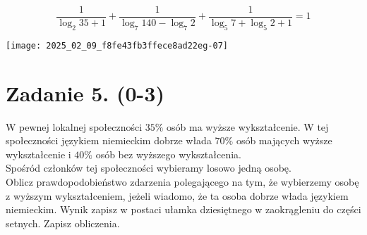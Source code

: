 \documentclass[10pt]{article}
\begin{document}
\[
\frac{1}{\log _{2} 35+1}+\frac{1}{\log _{7} 140-\log _{7} 2}+\frac{1}{\log _{5} 7+\log _{5} 2+1}=1
\]

\begin{center}
\texttt{[image: 2025\_02\_09\_f8fe43fb3ffece8ad22eg-07]}
\end{center}

\section*{Zadanie 5. (0-3)}
W pewnej lokalnej społeczności \(35 \%\) osób ma wyższe wykształcenie. W tej społeczności językiem niemieckim dobrze włada \(70 \%\) osób mających wyższe wykształcenie i \(40 \%\) osób bez wyższego wykształcenia.\\
Spośród członków tej społeczności wybieramy losowo jedną osobę.\\
Oblicz prawdopodobieństwo zdarzenia polegającego na tym, że wybierzemy osobę z wyższym wykształceniem, jeżeli wiadomo, że ta osoba dobrze włada językiem niemieckim. Wynik zapisz w postaci ułamka dziesiętnego w zaokrągleniu do części setnych. Zapisz obliczenia.
\end{document}
